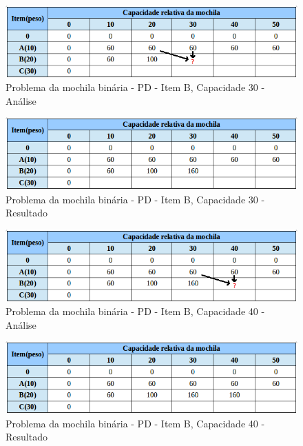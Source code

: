 \FloatBarrier
\begin{figure}[!h]
\centering
\includegraphics[keepaspectratio=true,scale=0.6]{figuras/mochila20_30.png}
\caption{Problema da mochila binária - PD - Item B, Capacidade 30 - Análise}
\label{mochila20_30}
\end{figure}

\FloatBarrier
\begin{figure}[!h]
\centering
\includegraphics[keepaspectratio=true,scale=0.6]{figuras/mochila20_30_resp.png}
\caption{Problema da mochila binária - PD - Item B, Capacidade 30 - Resultado}
\label{mochila20_30_resp}
\end{figure}

\FloatBarrier
\begin{figure}[!h]
\centering
\includegraphics[keepaspectratio=true,scale=0.6]{figuras/mochila20_40.png}
\caption{Problema da mochila binária - PD - Item B, Capacidade 40 - Análise}
\label{mochila20_40}
\end{figure}

\FloatBarrier
\begin{figure}[!h]
\centering
\includegraphics[keepaspectratio=true,scale=0.6]{figuras/mochila20_40_resp.png}
\caption{Problema da mochila binária - PD - Item B, Capacidade 40 - Resultado}
\label{mochila20_40_resp}
\end{figure}

